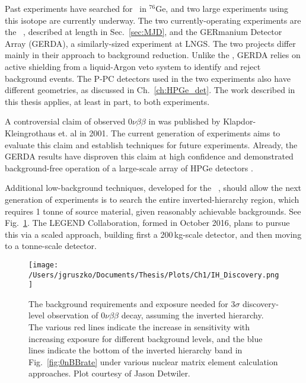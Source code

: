 Past experiments have searched for \nonubb\ in $^{76}$Ge, and two large experiments using this isotope are currently underway. The two currently-operating experiments are the \MJ\ \DEM, described at length in Sec.~\ref{sec:MJD}, and the GERmanium Detector Array (GERDA), a similarly-sized experiment at LNGS. The two projects differ mainly in their approach to background reduction. Unlike the \DEM, GERDA relies on active shielding from a liquid-Argon veto system to identify and reject background events. The P-PC detectors used in the two experiments also have different geometries, as discussed in Ch.~\ref{ch:HPGe_det}\cite{GERDA_Device2013}. The work described in this thesis applies, at least in part, to both experiments. 

A controversial claim of observed $0\nu\beta\beta$ in  was published by Klapdor-Kleingrothaus et. al in 2001\cite{KK2001}. The current generation of experiments aims to evaluate this claim and establish techniques for future experiments. Already, the GERDA results have disproven this claim at high confidence and demonstrated background-free operation of a large-scale array of HPGe detectors \cite{GERDA2017}. 

Additional low-background techniques, developed for the \MJ\ \DEM, should allow the next generation of experiments is to search the entire inverted-hierarchy region, which requires 1 tonne of source material, given reasonably achievable backgrounds. See Fig.~\ref{IH_Discovery}. The LEGEND Collaboration, formed in October 2016, plans to pursue this via a scaled approach, building first a 200\,kg-scale detector, and then moving to a tonne-scale detector.    

\begin{figure}[]
\texttt{[image: /Users/jgruszko/Documents/Thesis/Plots/Ch1/IH\_Discovery.png]}
\caption[The background requirements and exposure needed for $3\sigma$ discovery-level observation of $0\nu\beta\beta$ decay in the IH]{The background requirements and exposure needed for $3\sigma$ discovery-level observation of $0\nu\beta\beta$ decay, assuming the inverted hierarchy. The various red lines indicate the increase in sensitivity with increasing exposure for different background levels, and the blue lines indicate the bottom of the inverted hierarchy band in Fig.~\ref{fig:0nBBrate} under various nuclear matrix element calculation approaches. Plot courtesy of Jason Detwiler.}
\label{IH_Discovery}
\end{figure}


